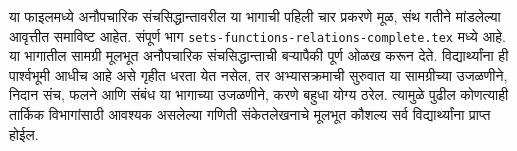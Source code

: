 \documentclass[../../include/open-logic-part]{subfiles}
\begin{document}

\begin{editorial}
  या फाइलमध्ये अनौपचारिक संचसिद्धान्तावरील या भागाची
  पहिली चार प्रकरणे मूळ, संथ गतीने मांडलेल्या आवृत्तीत
  समाविष्ट आहेत. संपूर्ण भाग
  \verb|sets-functions-relations-complete.tex| मध्ये आहे.
  या भागातील सामग्री मूलभूत अनौपचारिक संचसिद्धान्ताची
  बऱ्यापैकी पूर्ण ओळख करून देते. विद्यार्थ्यांना ही
  पार्श्वभूमी आधीच आहे असे गृहीत धरता येत नसेल, तर
  अभ्यासक्रमाची सुरुवात या सामग्रीच्या उजळणीने,
  निदान संच, फलने आणि संबंध या भागाच्या उजळणीने,
  करणे बहुधा योग्य ठरेल. त्यामुळे पुढील कोणत्याही
  तार्किक विभागांसाठी आवश्यक असलेल्या गणिती
  संकेतलेखनाचे मूलभूत कौशल्य सर्व विद्यार्थ्यांना
  प्राप्त होईल.
\end{editorial}





\OLEndPartHook
\end{document}
